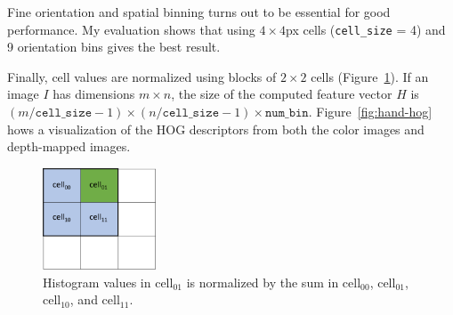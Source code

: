 Fine orientation and spatial binning turns out to be essential for good
performance. My evaluation shows that using $4\times 4$px cells
(\texttt{cell\_size} = 4) and 9 orientation bins gives the best result.

Finally, cell values are normalized using blocks of $2\times 2$ cells
(Figure~\ref{fig:cell}).
If an image $I$ has dimensions $m\times n$, the size of the computed feature vector
$H$ is $(m/\texttt{cell\_size} - 1) \times (n/\texttt{cell\_size} - 1) \times
\texttt{num\_bin}$. Figure~\ref{fig:hand-hog} hows a visualization of the HOG
descriptors from both the color images and depth-mapped images.

\begin{figure}[!tbh]
\centering
\includegraphics[width=0.3\textwidth]{figures/cell.png}
\caption{Histogram values in $\text{cell}_{01}$ is normalized by the sum in
$\text{cell}_{00}$, $\text{cell}_{01}$, $\text{cell}_{10}$,
and $\text{cell}_{11}$.
}
\label{fig:cell}
\end{figure}

